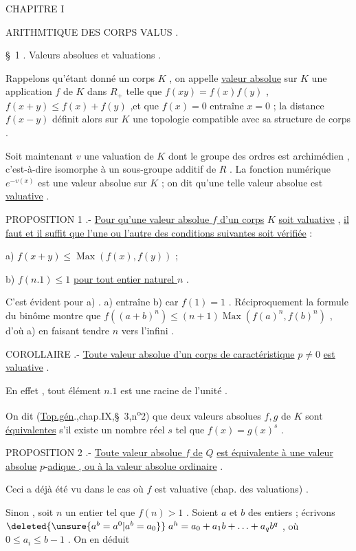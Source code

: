 \margin{-}\margin{-}CHAPITRE I

ARITHMTIQUE DES CORPS VALUS .

\S~1 . Valeurs absolues et valuations .

Rappelons qu'étant donné un corps $K$ , on appelle \uline{valeur absolue} sur $K$ une application $f$ de $K$ dans $R_{+}$ telle que $f(xy)=f(x)f(y)$ , $f(x+y)\leqslant f(x)+f(y)$ ,et que $f(x)=0$ entraîne $x=0$ ; la distance $f(x-y)$ définit alors sur $K$ une topologie compatible avec sa structure de corps .

Soit maintenant $v$ une valuation de $K$ dont le groupe des ordres est archimédien , c'est-à-dire isomorphe à un sous-groupe additif de $R$ . La fonction numérique $e^{-v(x)}$ est une valeur absolue sur $K$ ; on dit qu'une telle valeur absolue est \uline{valuative} .

PROPOSITION 1 .- \uline{Pour qu'une valeur absolue $f$ d'un corps} $K$ \uline{soit valuative} , \uline{il faut et il suffit que l'une ou l'autre des conditions suivantes soit vérifiée} :

a) $f(x+y)\leqslant \operatorname{Max}(f(x),f(y))$ ;

b) $f(n.1)\leqslant 1$ \uline{pour tout entier naturel $n$} .

C'est évident pour a) . a) entraîne b) car $f(1)=1$ . Réciproquement la formule du binôme montre que $f((a+b)^n)\leqslant (n+1)\operatorname{Max}(f(a)^n,f(b)^n)$ , d'où a) en faisant tendre $n$ vers l'infini .

COROLLAIRE  .- \uline{Toute valeur absolue d'un corps de caractéristique} $p\neq0$ \uline{est valuative} .

En effet , tout élément $n.1$ est une racine de l'unité .

On dit (\uline{Top.gén}.,chap.IX,\S~3,n\textsuperscript{o}2) que deux valeurs absolues $f,g$ de $K$ sont \uline{équivalentes} s'il existe un nombre réel $s$ tel que $f(x)=g(x)^s$ .

PROPOSITION 2 .- \uline{Toute valeur absolue $f$ de} $Q$ \uline{est équivalente à une valeur absolue} $p$-\uline{adique , ou à la valeur absolue ordinaire} .

Ceci a déjà été vu dans le cas où $f$ est valuative (chap. des valuations) .

Sinon , soit $n$ un entier tel que $f(n)>1$ . Soient $a$ et $b$ des entiers  ; écrivons $\deleted{\unsure{a^{b}=a^{0}|a^{b}=a_{0}}}\;a^{h}=a_{0}+a_{1}b+\ldots+a_{q}b^{q}$ , où $0\leqslant a_{i}\leqslant b-1$ . On en déduit

